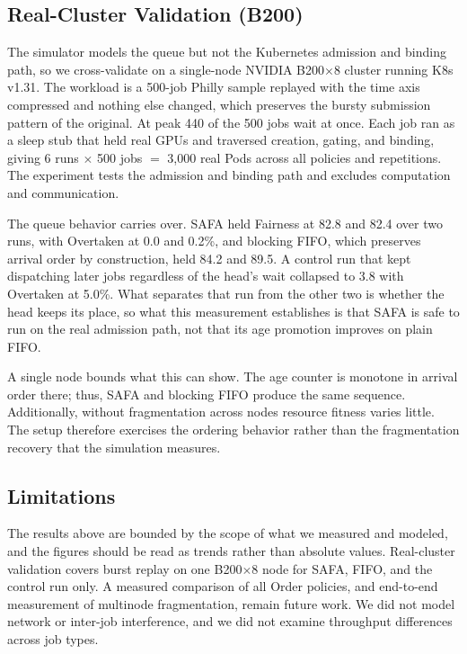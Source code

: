 \documentclass{ieeetj}
\begin{document}
\subsection{Real-Cluster Validation (B200)}\label{eval:b200}
The simulator models the queue but not the Kubernetes admission and binding path, so we cross-validate on a single-node NVIDIA B200$\times$8 cluster running K8s v1.31. The workload is a 500-job Philly sample replayed with the time axis compressed and nothing else changed, which preserves the bursty submission pattern of the original. At peak 440 of the 500 jobs wait at once. Each job ran as a sleep stub that held real GPUs and traversed creation, gating, and binding, giving 6 runs $\times$ 500 jobs $=$ 3{,}000 real Pods across all policies and repetitions. The experiment tests the admission and binding path and excludes computation and communication.

The queue behavior carries over. SAFA held Fairness at 82.8 and 82.4 over two runs, with Overtaken at 0.0 and 0.2\%, and blocking FIFO, which preserves arrival order by construction, held 84.2 and 89.5. A control run that kept dispatching later jobs regardless of the head's wait collapsed to 3.8 with Overtaken at 5.0\%. What separates that run from the other two is whether the head keeps its place, so what this measurement establishes is that SAFA is safe to run on the real admission path, not that its age promotion improves on plain FIFO.

A single node bounds what this can show. The age counter is monotone in arrival order there; thus, SAFA and blocking FIFO produce the same sequence. Additionally, without fragmentation across nodes resource fitness varies little. The setup therefore exercises the ordering behavior rather than the fragmentation recovery that the simulation measures.

\subsection{Limitations}\label{eval:threats}
The results above are bounded by the scope of what we measured and modeled, and the figures should be read as trends rather than absolute values. Real-cluster validation covers burst replay on one B200$\times$8 node for SAFA, FIFO, and the control run only. A measured comparison of all Order policies, and end-to-end measurement of multinode fragmentation, remain future work. We did not model network or inter-job interference, and we did not examine throughput differences across job types.
\end{document}
